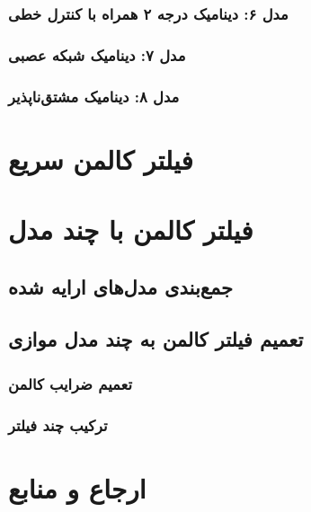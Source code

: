 \documentclass{scribe-cgenomics}
\begin{document}
\subsubsection{مدل ۶: دینامیک درجه ۲ همراه با کنترل خطی}
\subsubsection{مدل ۷: دینامیک شبکه عصبی}
\subsubsection{مدل ۸: دینامیک مشتق‌ناپذیر}


\section{فیلتر کالمن سریع}


\section{فیلتر کالمن با چند مدل}
\subsection{جمع‌بندی مدل‌های ارایه شده}
\subsection{تعمیم فیلتر کالمن به چند مدل موازی}
\subsubsection{تعمیم ضرایب کالمن}
\subsubsection{ترکیب چند فیلتر}

\section{ارجاع و منابع}




\end{document}
